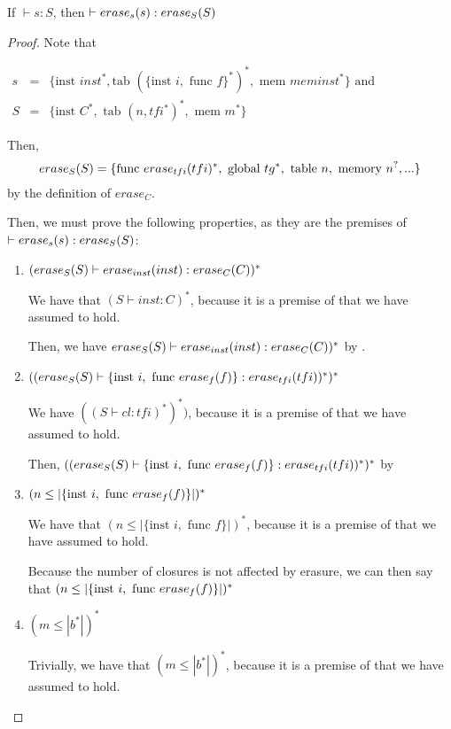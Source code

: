 \begin{lemma}{}

    If $\vdash s : S$, then $\vdash \erase[s]{s} : \erase[S]{S}$
\end{lemma}
\begin{proof}

    Note that

    \begin{math}
        \begin{array}{rcl}
            s &=& \{\text{inst } inst^{*}, \text{tab } (\{\text{inst } i, \text{ func } f\}^{*})^{*}, \text{ mem } meminst^{*}\} \text{ and}\\
            S &=& \{\text{inst } C^{*}, \text{ tab } (n,tfi^{*})^{*}, \text{ mem } m^{*}\}
        \end{array}
    \end{math}

    Then, $$\erase[S]{S}=\{\text{func } \erase[tfi]{tfi}^{*}, \text{ global } tg^{*}, \text{ table } n, \text{ memory } n^{?}, ...\}$$ by the definition of $erase_C$.

    Then, we must prove the following properties, as they are the premises of $\vdash \erase[s]{s} : \erase[S]{S}$:
    \begin{enumerate}
        \item $(\erase[S]{S} \vdash \erase[inst]{inst} : \erase[C]{C})^{*}$

        We have that $(S \vdash inst : C)^{*}$, because it is a premise of  that we have assumed to hold.

        Then, we have $\erase[S]{S} \vdash \erase[inst]{inst} : \erase[C]{C})^{*}$ by .

        \item $((\erase[S]{S} \vdash \{\text{inst } i, \text{ func } \erase[f]{f}\} : \erase[tfi]{tfi})^{*})^{*}$

        We have $((S \vdash cl :  tfi)^{*})^{*})$, because it is a premise of  that we have assumed to hold.

        Then, $((\erase[S]{S} \vdash \{\text{inst } i, \text{ func } \erase[f]{f}\} : \erase[tfi]{tfi})^{*})^{*}$ by 

        \item $(n \leq |\{\text{inst } i, \text{ func } \erase[f]{f}\}|)^{*}$

        We have that $(n \leq |\{\text{inst } i, \text{ func } f\}|)^{*}$, because it is a premise of  that we have assumed to hold.

        Because the number of closures is not affected by erasure, we can then say that $(n \leq |\{\text{inst } i, \text{ func } \erase[f]{f}\}|)^{*}$

        \item $(m \leq |b^{*}|)^{*}$

        Trivially, we have that $(m \leq |b^{*}|)^{*}$, because it is a premise of  that we have assumed to hold.
    \end{enumerate}
\end{proof}

